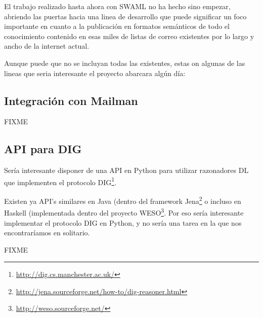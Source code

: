 El trabajo realizado hasta ahora con SWAML no ha hecho sino empezar, abriendo las 
puertas hacia una linea de desarrollo que puede significar un foco importante
en cuanto a la publicación en formatos semánticos de todo el conocimiento contenido
en esas miles de listas de correo existentes por lo largo y ancho de la internet
actual.

Aunque puede que no se incluyan todas las existentes, estas on algunas de las lineas
que seria interesante el proyecto abarcara algún día:

\subsection*{Integración con Mailman}

FIXME

\subsection*{API para DIG}

Sería interesante disponer de una API en Python para utilizar razonadores DL que implementen 
el protocolo DIG\footnote{\url{http://dig.cs.manchester.ac.uk/}}. 

Existen ya API's similares en Java (dentro del framework
Jena\footnote{\url{http://jena.sourceforge.net/how-to/dig-reasoner.html}} o incluso en Haskell 
(implementada dentro del proyecto WESO\footnote{\url{http://weso.sourceforge.net/}}. Por eso 
sería interesante implementar el protocolo DIG en Python, y no sería una tarea
en la que nos encontraríamos en solitario\cite{PythonOWL}.

FIXME

